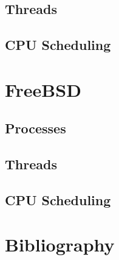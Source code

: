 \documentclass[10pt,letterpaper,onecolumn,draftclsnofoot]{IEEEtran}
\begin{document}
  \subsection{Threads}
  \subsection{CPU Scheduling}
\section{FreeBSD}
  \subsection{Processes}
  \subsection{Threads}
  \subsection{CPU Scheduling}

\clearpage
\section{Bibliography}



\end{document}

